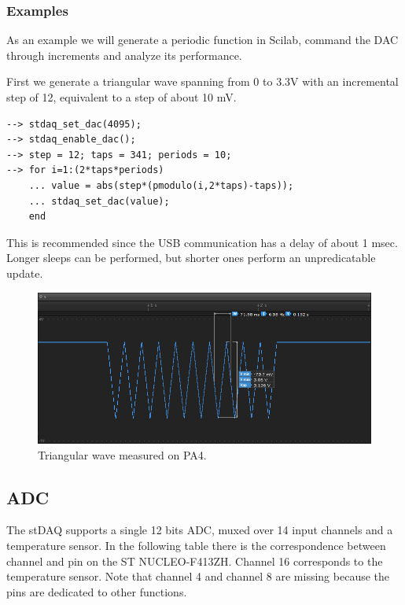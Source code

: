 \documentclass[letterpaper,10pt,english]{hitec}
\begin{document}
\subsubsection{Examples}

As an example we will generate a periodic function in Scilab, command the DAC through increments and analyze its performance.

First we generate a triangular wave spanning from 0 to 3.3V with an incremental step of 12, equivalent to a step of about 10 mV.
\begin{verbatim}
--> stdaq_set_dac(4095);
--> stdaq_enable_dac();
--> step = 12; taps = 341; periods = 10;
--> for i=1:(2*taps*periods)
    ... value = abs(step*(pmodulo(i,2*taps)-taps));
    ... stdaq_set_dac(value);
    end
\end{verbatim}
This is recommended since the USB communication has a delay of about 1 msec. 
Longer sleeps can be performed, but shorter ones perform an unpredicatable update.

\begin{figure}[ht!]
\includegraphics[scale=0.8]{../img/triangular_wave2.png}
\caption{Triangular wave measured on PA4.}
\label{fig:triangular_wave}
\end{figure}

\hrulefill

\subsection{ADC}

The stDAQ supports a single 12 bits ADC, muxed over 14 input channels and a temperature sensor.
In the following table there is the correspondence between channel and pin on the ST NUCLEO-F413ZH.
Channel 16 corresponds to the temperature sensor. Note that channel 4 and channel 8 are missing because the pins are dedicated to other functions.
\end{document}
